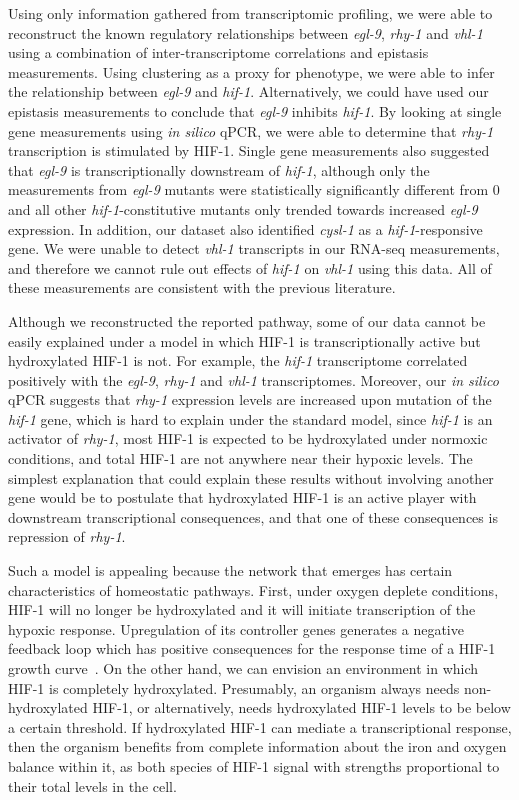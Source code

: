\documentclass[9pt,twocolumn,twoside]{pnas-new}
\newcommand{\egl}{\emph{egl-9}}
\newcommand{\cysl}{\emph{cysl-1}}
\newcommand{\rhy}{\emph{rhy-1}}
\newcommand{\vhl}{\emph{vhl-1}}
\newcommand{\hif}{\emph{hif-1}}
\newcommand{\hifp}{HIF-1}
\begin{document}
Using only information gathered from transcriptomic profiling, we were able to
reconstruct the known regulatory relationships between \egl{}, \rhy{} and \vhl{}
using a combination of inter-transcriptome correlations and epistasis
measurements. Using clustering as a proxy for phenotype, we were able to infer
the relationship between \egl{} and \hif{}.
Alternatively, we could have used our epistasis measurements to conclude that
\egl{} inhibits \hif{}. By looking at single gene measurements using \emph{in
silico} qPCR, we were able to determine that \rhy{} transcription is stimulated
by \hifp{}. Single gene measurements also suggested that \egl{} is
transcriptionally downstream of \hif{}, although only the measurements from
\egl{} mutants were statistically significantly different from 0 and all other
\hif{}-constitutive mutants only trended towards increased \egl{} expression.
In addition, our dataset also identified \cysl{} as a \hif{}-responsive gene.
We were unable to detect \vhl{} transcripts in our RNA-seq measurements, and
therefore we cannot rule out effects of \hif{} on \vhl{} using this data. All
of these measurements are consistent with the previous literature.

Although we reconstructed the reported pathway, some of our data cannot be
easily explained under a model in which \hifp{} is transcriptionally active but
hydroxylated \hifp{} is not. For example, the \hif{} transcriptome correlated
positively with the \egl{}, \rhy{} and \vhl{} transcriptomes. Moreover, our
\emph{in silico} qPCR suggests that \rhy{} expression levels are increased upon
mutation of the \hif{} gene, which is hard to explain under the standard model,
since \hif{} is an activator of \rhy{}, most \hifp{} is expected to be
hydroxylated under normoxic conditions, and total \hifp{} are not anywhere near
their hypoxic levels. The simplest explanation that could explain these results
without involving another gene would be to postulate that hydroxylated \hifp{}
is an active player with downstream transcriptional consequences, and that one
of these consequences is repression of \rhy{}.

Such a model is appealing because the network that emerges has certain
characteristics of homeostatic pathways. First, under oxygen deplete conditions,
\hifp{} will no longer be hydroxylated and it will initiate transcription of the
hypoxic response. Upregulation of its controller genes generates a negative
feedback loop which has positive consequences for the response time of a \hifp{}
growth curve~\cite{Alon2007}. On the other hand, we can envision an environment
in which \hifp{} is completely hydroxylated. Presumably, an organism always
needs non-hydroxylated \hifp{}, or alternatively, needs hydroxylated \hifp{}
levels to be below a certain threshold. If hydroxylated \hifp{} can mediate a
transcriptional response, then the organism benefits from complete information
about the iron and oxygen balance within it, as both species of \hifp{} signal
with strengths proportional to their total levels in the cell.
\end{document}
